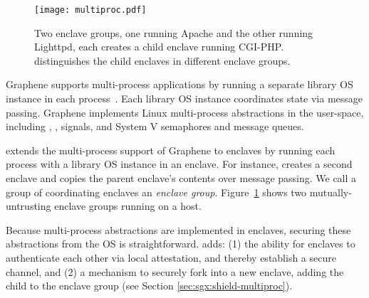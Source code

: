 \begin{figure}[t!]
\centering
\texttt{[image: multiproc.pdf]}
\caption{Two enclave groups, one running Apache and the other running Lighttpd, each creates a child enclave running CGI-PHP.
\graphenesgx{} distinguishes the child enclaves in different enclave groups.}
\label{fig:multiproc-threats}
\end{figure}

Graphene supports multi-process applications by running
a separate library OS instance in each process~\cite{tsai14graphene}.
Each library OS instance coordinates state via message passing.
Graphene implements Linux multi-process abstractions in the user-space, including , , signals, and System V semaphores and message queues.

\graphenesgx{} extends the multi-process support of Graphene to enclaves by running each
process with a library OS instance in an enclave.
For instance,  creates a second enclave
and copies the parent enclave's contents over message passing.
We call a group of coordinating enclaves an \emph{enclave group}.
Figure~\ref{fig:multiproc-threats} shows two mutually-untrusting enclave groups running on a host.


Because multi-process abstractions are implemented in enclaves,
securing these abstractions from the OS is straightforward. 
\graphenesgx{} adds: %
(1) the ability for enclaves to authenticate each other via local attestation,
and thereby establish a secure channel,
and (2) a mechanism to securely fork into a new enclave, adding the child to the enclave group (see Section \ref{sec:sgx:shield-multiproc}).




